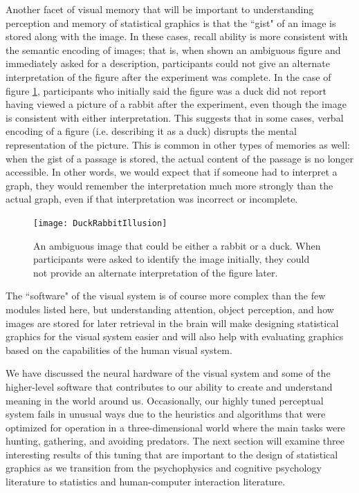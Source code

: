 \documentclass[11pt]{isuthesis}\usepackage[]{graphicx}\usepackage[]{color}
\begin{document}
Another facet of visual memory that will be important to understanding perception and memory of statistical graphics is that the ``gist" of an image is stored along with the image. In these cases, recall ability is more consistent with the semantic encoding of images; that is, when shown an ambiguous figure and immediately asked for a description, participants could not give an alternate interpretation of the figure after the experiment was complete. In the case of  figure \ref{fig:ambiguousrabbit}, participants who initially said the figure was a duck did not report having viewed a picture of a rabbit after the experiment, even though the image is consistent with either interpretation. This suggests that in some cases, verbal encoding of a figure (i.e. describing it as a duck) disrupts the mental representation of the picture. This is common in other types of memories as well: when the gist of a passage is stored, the actual content of the passage is no longer accessible. In other words, we would expect that if someone had to interpret a graph, they would remember the interpretation much more strongly than the actual graph, even if that interpretation was incorrect or incomplete. 

\begin{figure}[htbp]\centering
\texttt{[image: DuckRabbitIllusion]}
\caption[Ambiguous Images]{An ambiguous image that could be either a rabbit or a duck. When participants were asked to identify the image initially, they could not provide an alternate interpretation of the figure later.}\label{fig:ambiguousrabbit}
\end{figure}

The ``software" of the visual system is of course more complex than the few modules listed here, but understanding attention, object perception, and how images are stored for later retrieval in the brain will make designing statistical graphics for the visual system easier and will also help with evaluating graphics based on the capabilities of the human visual system. 

We have discussed the neural hardware of the visual system and some of the higher-level software that contributes to our ability to create and understand meaning in the world around us. Occasionally, our highly tuned perceptual system fails in unusual ways due to the heuristics and algorithms that were optimized for operation in a three-dimensional world where the main tasks were hunting, gathering, and avoiding predators. The next section will examine three interesting results of this tuning that are important to the design of statistical graphics as we transition from the psychophysics and cognitive psychology literature to statistics and human-computer interaction literature. 
\end{document}

